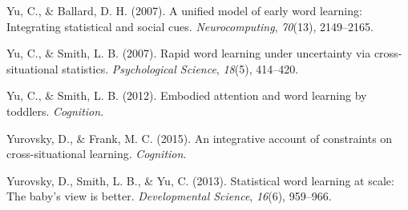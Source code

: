 \documentclass[authoryear, review]{elsarticle}
\begin{document}
\hypertarget{ref-yu2007unified}{}
Yu, C., \& Ballard, D. H. (2007). A unified model of early word
learning: Integrating statistical and social cues.
\emph{Neurocomputing}, \emph{70}(13), 2149--2165.

\hypertarget{ref-yu2007rapid}{}
Yu, C., \& Smith, L. B. (2007). Rapid word learning under uncertainty
via cross-situational statistics. \emph{Psychological Science},
\emph{18}(5), 414--420.

\hypertarget{ref-yu2012embodied}{}
Yu, C., \& Smith, L. B. (2012). Embodied attention and word learning by
toddlers. \emph{Cognition}.

\hypertarget{ref-yurovsky2014algorithmic}{}
Yurovsky, D., \& Frank, M. C. (2015). An integrative account of
constraints on cross-situational learning. \emph{Cognition}.

\hypertarget{ref-yurovsky2013statistical}{}
Yurovsky, D., Smith, L. B., \& Yu, C. (2013). Statistical word learning
at scale: The baby's view is better. \emph{Developmental Science},
\emph{16}(6), 959--966.


\end{document}
